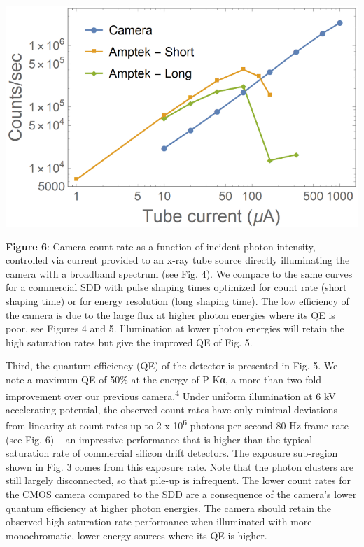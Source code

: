 \FloatBarrier


\begin{center}
\includegraphics{NewCameraPaper_1.10.docx1502867018/media/image6.png}
\end{center}

\textbf{Figure 6}: Camera count rate as a function of incident photon
intensity, controlled via current provided to an x-ray tube source
directly illuminating the camera with a broadband spectrum (see Fig. 4).
We compare to the same curves for a commercial SDD with pulse shaping
times optimized for count rate (short shaping time) or for energy
resolution (long shaping time). The low efficiency of the camera is due
to the large flux at higher photon energies where its QE is poor, see
Figures 4 and 5. Illumination at lower photon energies will retain the
high saturation rates but give the improved QE of Fig. 5.
\bigbreak

Third, the quantum efficiency (QE) of the detector is presented in Fig.
5. We note a maximum QE of 50\% at the energy of P Kα, a more than
two-fold improvement over our previous camera.\textsuperscript{4} Under
uniform illumination at 6 kV accelerating potential, the observed count
rates have only minimal deviations from linearity at count rates up to 2
x 10\textsuperscript{6} photons per second 80 Hz frame rate (see Fig. 6)
-- an impressive performance that is higher than the typical saturation
rate of commercial silicon drift detectors. The exposure sub-region
shown in Fig. 3 comes from this exposure rate. Note that the photon
clusters are still largely disconnected, so that pile-up is infrequent.
The lower count rates for the CMOS camera compared to the SDD are a
consequence of the camera's lower quantum efficiency at higher photon
energies. The camera should retain the observed high saturation rate
performance when illuminated with more monochromatic, lower-energy
sources where its QE is higher.

